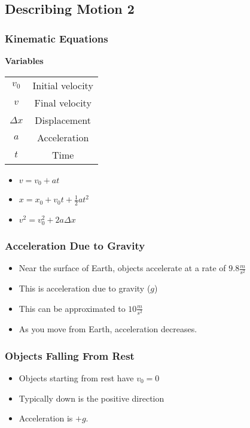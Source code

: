 \documentclass[../Notes.tex]{subfiles}
\begin{document}
\newpage
\subsection{Describing Motion 2}

\subsubsection{Kinematic Equations}
\begin{center}
\textbf{Variables}\\
\begin{tabular}{|c|c|}
\hline 
$v_0$ & Initial velocity \\
$v$ & Final velocity \\
$\Delta x$ & Displacement \\
$a$ & Acceleration \\
$t$ & Time \\
\hline
\end{tabular}
\end{center}
\begin{itemize}
	\item $v = v_0 + at$
	\item $x = x_0 + v_0 t + \frac12 at^2$
	\item $v^2 = v_0^2 + 2a\Delta x$
\end{itemize}

\subsubsection{Acceleration Due to Gravity}
\begin{itemize}
	\item Near the surface of Earth, objects accelerate at a rate of $9.8 \frac m{s^2}$
	\item This is acceleration due to gravity ($g$)
	\item This can be approximated to $10 \frac m{s^2}$
	\item As you move from Earth, acceleration decreases.
\end{itemize}

\subsubsection{Objects Falling From Rest}
\begin{itemize}
	\item Objects starting from rest have $v_0 = 0$
	\item Typically down is the positive direction
	\item Acceleration is $+g$.
\end{itemize}
\end{document}
